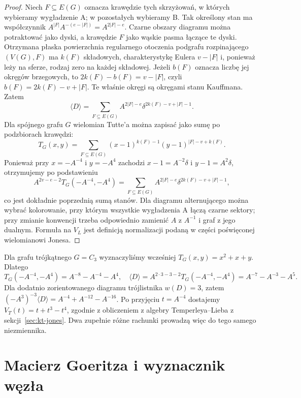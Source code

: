 \begin{proof}
Niech $F\subseteq E(G)$ oznacza krawędzie tych skrzyżowań,
w których wybieramy wygładzenie A; w pozostałych
wybieramy B. Tak określony stan ma współczynnik
$A^{|F|}A^{-(e-|F|)}=A^{2|F|-e}$.
Czarne obszary diagramu można potraktować jako dyski,
a krawędzie $F$ jako wąskie pasma łączące te dyski.
Otrzymana płaska powierzchnia regularnego otoczenia
podgrafu rozpinającego $(V(G),F)$ ma $k(F)$ składowych,
charakterystykę Eulera $v-|F|$ i, ponieważ leży na
sferze, rodzaj zero na każdej składowej. Jeżeli
$b(F)$ oznacza liczbę jej okręgów brzegowych, to
$2k(F)-b(F)=v-|F|$, czyli
$b(F)=2k(F)-v+|F|$.
Te właśnie okręgi są okręgami stanu Kauffmana.
Zatem
\[
\langle D\rangle=
\sum_{F\subseteq E(G)}
 A^{2|F|-e}\delta^{2k(F)-v+|F|-1}.
\]
Dla spójnego grafu $G$ wielomian Tutte'a można
zapisać jako sumę po podzbiorach krawędzi:
\[
T_G(x,y)=\sum_{F\subseteq E(G)}
(x-1)^{k(F)-1}(y-1)^{|F|-v+k(F)}.
\]
Ponieważ przy $x=-A^{-4}$ i $y=-A^4$ zachodzi
$x-1=A^{-2}\delta$ i $y-1=A^2\delta$,
otrzymujemy po podstawieniu
\[
A^{2v-e-2}T_G(-A^{-4},-A^4)
=\sum_{F\subseteq E(G)}
 A^{2|F|-e}\delta^{2k(F)-v+|F|-1},
\]
co jest dokładnie poprzednią sumą stanów.
Dla diagramu alternującego można wybrać kolorowanie,
przy którym wszystkie wygładzenia A łączą czarne
sektory; przy zmianie konwencji trzeba odpowiednio
zamienić $A$ z $A^{-1}$ i graf z jego dualnym.
Formuła na $V_L$ jest definicją normalizacji
podaną w części poświęconej wielomianowi Jonesa.
\end{proof}

\begin{przyklad}
Dla grafu trójkątnego $G=C_3$ wyznaczyliśmy wcześniej
$T_G(x,y)=x^2+x+y$. Dlatego
\[
T_G(-A^{-4},-A^4)=A^{-8}-A^{-4}-A^4,
\quad
\langle D\rangle=A^{2\cdot3-3-2}T_G(-A^{-4},-A^4)
=A^{-7}-A^{-3}-A^5.
\]
Dla dodatnio zorientowanego diagramu trójlistnika
$w(D)=3$, zatem
$(-A^3)^{-3}\langle D\rangle
=A^{-4}+A^{-12}-A^{-16}$.
Po przyjęciu $t=A^{-4}$ dostajemy
$V_T(t)=t+t^3-t^4$, zgodnie z obliczeniem
z algebry Temperleya--Lieba z sekcji~\ref{sec:kt-jones}.
Dwa zupełnie różne
rachunki prowadzą więc do tego samego niezmiennika.
\end{przyklad}

\section{Macierz Goeritza i wyznacznik węzła}
\label{sec:tg-goeritz}

